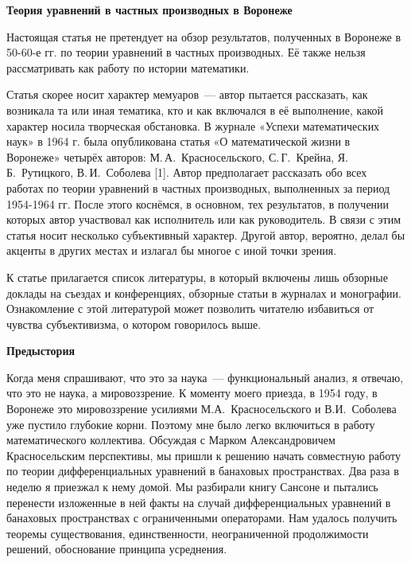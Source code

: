 
\vzmscaption

{ \bf Теория уравнений в частных производных в Воронеже}

Настоящая статья не претендует на обзор результатов, полученных в Воронеже в 50-60-е гг. по теории уравнений в частных производных. Её также нельзя рассматривать как работу по истории математики.

Статья скорее носит характер мемуаров~--- автор пытается рассказать, как возникала та или иная тематика,
кто и как включался в её выполнение, какой характер носила творческая обстановка.
В журнале «Успехи математических наук» в 1964 г. была опубликована статья «О математической жизни в Воронеже»
четырёх авторов: М.\,А.~Красносельского, С.\,Г.~Крейна, Я.\,Б.~Рутицкого, В.\,И.~Соболева [1].
Автор предполагает рассказать обо всех работах по теории уравнений в частных производных, выполненных за период 1954-1964 гг. После этого коснёмся, в основном, тех результатов, в получении которых автор участвовал как исполнитель или как руководитель. В связи с этим статья носит несколько субъективный характер. Другой автор, вероятно, делал бы акценты в других местах и излагал бы многое с иной точки зрения.

К статье прилагается список литературы, в который
\linebreak
включены лишь обзорные доклады на съездах и конференциях,
обзорные статьи в журналах и монографии. Ознакомление с этой литературой может позволить читателю избавиться от чувства субъективизма, о котором говорилось выше.

{\bf Предыстория}

Когда меня спрашивают, что это за наука~--- функциональный анализ, я отвечаю, что это не наука, а мировоззрение.
К моменту моего приезда, в 1954 году, в Воронеже это мировоззрение усилиями М.А.~Красносельского и В.И.~Соболева уже пустило глубокие корни. Поэтому мне было легко включиться в работу математического коллектива. Обсуждая с Марком Александровичем Красносельским перспективы, мы пришли к решению начать совместную работу по теории дифференциальных уравнений в банаховых пространствах. Два раза в неделю я приезжал к нему домой. Мы разбирали книгу Сансоне и пытались
перенести изложенные в ней факты на случай дифференциальных уравнений в банаховых пространствах с ограниченными операторами. Нам удалось получить теоремы существования, единственности, неограниченной продолжимости решений, обоснование принципа усреднения.

